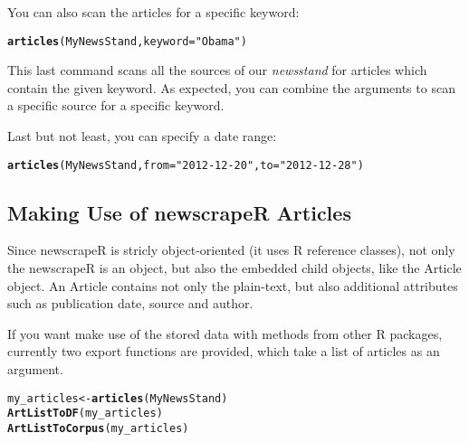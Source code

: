 \documentclass[a4paper,11pt]{article}\usepackage{graphicx, color}
\makeatletter
\newcommand{\hlfunctioncall}[1]{\textcolor[rgb]{0.501960784313725,0,0.329411764705882}{\textbf{#1}}}%
\newcommand{\hlstring}[1]{\textcolor[rgb]{0.6,0.6,1}{#1}}%
\newenvironment{kframe}{%
 \def\at@end@of@kframe{}%
 \ifinner\ifhmode%
  \def\at@end@of@kframe{\end{minipage}}%
  \begin{minipage}{\columnwidth}%
 \fi\fi%
 \def\FrameCommand##1{\hskip\@totalleftmargin \hskip-\fboxsep
 \colorbox{shadecolor}{##1}\hskip-\fboxsep
     \hskip-\linewidth \hskip-\@totalleftmargin \hskip\columnwidth}%
 \MakeFramed {\advance\hsize-\width
   \@totalleftmargin\z@ \linewidth\hsize
   \@setminipage}}%
 {\par\unskip\endMakeFramed%
 \at@end@of@kframe}
\newenvironment{knitrout}{}{} %
\makeatother
\begin{document}
You can also scan the articles for a specific keyword:

\begin{knitrout}
\color{fgcolor}\begin{kframe}
\begin{alltt}
\hlfunctioncall{articles}(MyNewsStand, keyword = \hlstring{"Obama"})
\end{alltt}
\end{kframe}
\end{knitrout}


This last command scans all the sources of our \emph{newsstand} for articles which contain the given keyword. As expected, you can combine the arguments to scan a specific source for a specific keyword. 

Last but not least, you can specify a date range:
\begin{knitrout}
\color{fgcolor}\begin{kframe}
\begin{alltt}
\hlfunctioncall{articles}(MyNewsStand, from = \hlstring{"2012-12-20"}, to = \hlstring{"2012-12-28"})
\end{alltt}
\end{kframe}
\end{knitrout}


\subsection{Making Use of newscrapeR Articles}

Since newscrapeR is stricly object-oriented (it uses R reference classes), not only the newscrapeR is an object, but also the embedded child objects, like the Article object. An Article contains not only the plain-text, but also additional attributes such as publication date, source and author. 

If you want make use of the stored data with methods from other R packages, currently two export functions are provided, which take a list of articles as an argument. 

\begin{knitrout}
\color{fgcolor}\begin{kframe}
\begin{alltt}
my_articles <- \hlfunctioncall{articles}(MyNewsStand)
\hlfunctioncall{ArtListToDF}(my_articles)
\hlfunctioncall{ArtListToCorpus}(my_articles)
\end{alltt}
\end{kframe}
\end{knitrout}
\end{document}
